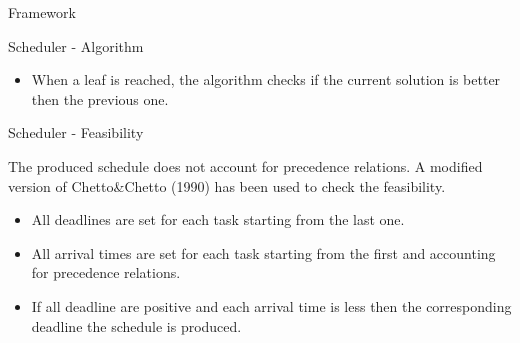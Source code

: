 \documentclass[xcolor=dvipsnames]{beamer}
\begin{document}
\begin{section}{Framework}
\begin{frame}{\hskip 0.3cm Scheduler - Algorithm}
\begin{itemize}
\item When a leaf is reached, the algorithm checks if the current solution is better then the previous one.

\end{itemize}

\end{frame}












\begin{frame}{\hskip 0.3cm Scheduler - Feasibility}

The produced schedule does not account for precedence relations. A modified version of Chetto\&Chetto (1990) has been used to check the feasibility.

\begin{itemize}

\item All deadlines are set for each task starting from the last one.

\item All arrival times are set for each task starting from the first and accounting for precedence relations.

\item If all deadline are positive and each arrival time is less then the corresponding deadline the schedule is produced.

\end{itemize}



\end{frame}








\end{section}
\end{document}
